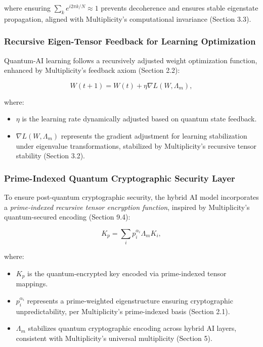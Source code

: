 \documentclass[12pt]{article}
\begin{document}
where ensuring \(\sum_k e^{i 2\pi k / N} \approx 1\) prevents decoherence and ensures stable eigenstate propagation, aligned with Multiplicity’s computational invariance (Section 3.3).

\subsubsection{Recursive Eigen-Tensor Feedback for Learning Optimization}

Quantum-AI learning follows a recursively adjusted weight optimization function, enhanced by Multiplicity’s feedback axiom (Section 2.2):

\begin{equation}
    W(t+1) = W(t) + \eta \nabla L(W, \Lambda_m),
\end{equation}

where:
\begin{itemize}
    \item \(\eta\) is the learning rate dynamically adjusted based on quantum state feedback.
    \item \(\nabla L(W, \Lambda_m)\) represents the gradient adjustment for learning stabilization under eigenvalue transformations, stabilized by Multiplicity’s recursive tensor stability (Section 3.2).
\end{itemize}

\subsubsection{Prime-Indexed Quantum Cryptographic Security Layer}

To ensure post-quantum cryptographic security, the hybrid AI model incorporates a \textit{prime-indexed recursive tensor encryption function}, inspired by Multiplicity’s quantum-secured encoding (Section 9.4):

\begin{equation}
    K_p = \sum_{i} p^{\alpha_i}_i \Lambda_m K_i,
\end{equation}

where:
\begin{itemize}
    \item \(K_p\) is the quantum-encrypted key encoded via prime-indexed tensor mappings.
    \item \(p^{\alpha_i}_i\) represents a prime-weighted eigenstructure ensuring cryptographic unpredictability, per Multiplicity’s prime-indexed basis (Section 2.1).
    \item \(\Lambda_m\) stabilizes quantum cryptographic encoding across hybrid AI layers, consistent with Multiplicity’s universal multiplicity (Section 5).
\end{itemize}
\end{document}
